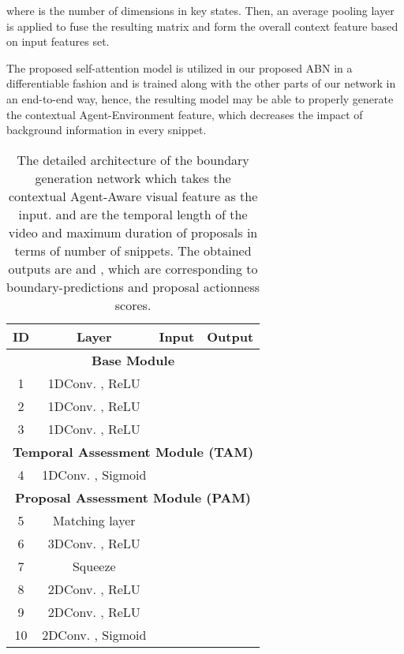 \documentclass{ieeeaccess}
\begin{document}
where  is the number of dimensions in key states. Then, an average pooling layer is applied to fuse the resulting matrix  and form the overall context feature based on input features set.

The proposed self-attention model is utilized in our proposed ABN in a differentiable fashion and is trained along with the other parts of our network in an end-to-end way, hence, the resulting model may be able to properly generate the contextual Agent-Environment feature, which decreases the impact of background information in every snippet.

\begin{table*}[!t]
\centering
\caption{The detailed architecture of the boundary generation network which takes the contextual Agent-Aware visual feature   as the input.  and  are the temporal length of the video and maximum duration of proposals in terms of number of snippets. The obtained outputs are  and , which are corresponding to boundary-predictions and proposal actionness scores.}

\begin{tabular}{c|c|c|c}
\hline
\textbf{ID} & \textbf{Layer} & \textbf{Input}  & \textbf{Output} \\
\hline \hline
\multicolumn{4}{c}{\textbf{Base Module}} \\
\hline
1 & 1DConv.  \newline , ReLU &  & \\
\hline
2 & 1DConv. \newline , ReLU &  & \\
\hline
3 & 1DConv.  \newline , ReLU &  & \\
\hline
\hline
\multicolumn{4}{c}{\textbf{Temporal Assessment Module (TAM)}} \\
\hline
4 & 1DConv.  \newline  , Sigmoid &   & \\
\hline
\hline
\multicolumn{4}{c}{\textbf{Proposal Assessment Module (PAM)}} \\
\hline
5 & Matching layer &  & \\
\hline
6 & 3DConv.  \newline  , ReLU &   & \\
 \hline
7 & Squeeze   &   & \\
 \hline
8 & 2DConv.  \newline  , ReLU &   & \\
 
 \hline
9 & 2DConv.  \newline  , ReLU &   & \\
 \hline
10 & 2DConv.  \newline  , Sigmoid &   & \\
\hline
\end{tabular}
\label{tab:bmn}
\end{table*}
\end{document}
